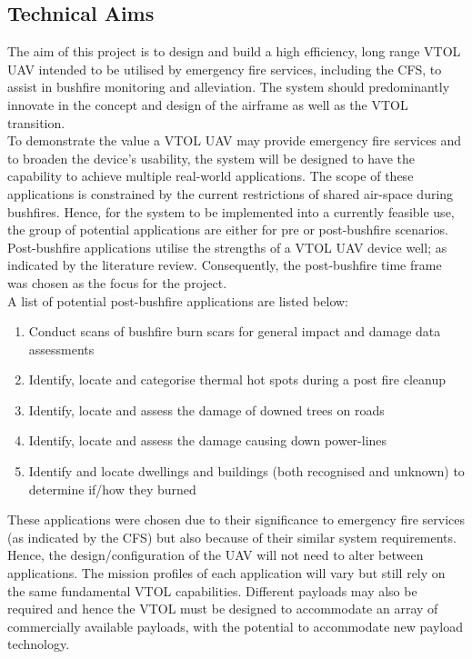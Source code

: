 \begin{appendices}
\section{Technical Aims}
\label{app_technical}
The aim of this project is to design and build a high efficiency, long range VTOL UAV intended to be utilised by emergency fire services, including the CFS, to assist in bushfire monitoring and alleviation. The system should predominantly innovate in the concept and design of the airframe as well as the VTOL transition.\\

To demonstrate the value a VTOL UAV may provide emergency fire services and to broaden the device's usability, the system will be designed to have the capability to achieve multiple real-world applications. The scope of these applications is constrained by the current restrictions of shared air-space during bushfires. Hence, for the system to be implemented into a currently feasible use, the group of potential applications are either for pre or post-bushfire scenarios. Post-bushfire applications utilise the strengths of a VTOL UAV device well; as indicated by the literature review. Consequently, the post-bushfire time frame was chosen as the focus for the project.  \\

A list of potential post-bushfire applications are listed below:
    \begin{enumerate}
       \item Conduct scans of bushfire burn scars for general  impact and damage data assessments
        \item Identify, locate and categorise thermal hot spots during a post fire cleanup
        \item Identify, locate and assess the damage of downed trees on roads
        \item Identify, locate and assess the damage causing down power-lines
        \item Identify and locate dwellings and buildings (both recognised and unknown) to determine if/how they burned
    \end{enumerate}

These applications were chosen due to their significance to emergency fire services (as indicated by the CFS) but also because of their similar system requirements. Hence, the design/configuration of the UAV will not need to alter between applications. The mission profiles of each application will vary but still rely on the same fundamental VTOL capabilities. Different payloads may also be required and hence the VTOL must be designed to accommodate an array of commercially available payloads, with the potential to accommodate new payload technology. \\


\end{appendices}
